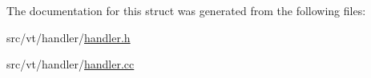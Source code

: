 The documentation for this struct was generated from the following files\+:\begin{DoxyCompactItemize}
\item 
src/vt/handler/\hyperlink{handler_8h}{handler.\+h}\item 
src/vt/handler/\hyperlink{handler_8cc}{handler.\+cc}\end{DoxyCompactItemize}
